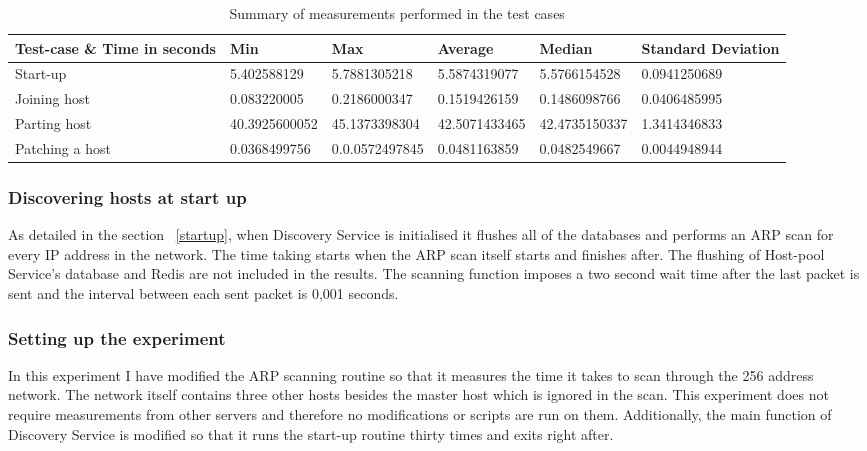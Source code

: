 \begin{landscape}
\begin{table}
\centering
\begin{tabular}{ | l || l | l | l | l | l |}
\hline 
Test-case \& Time in seconds & Min & Max & Average & Median & Standard Deviation \\
\hline \hline
Start-up & 5.402588129 & 5.7881305218 & 5.5874319077 & 5.5766154528 & 0.0941250689 \\
\hline
Joining host & 0.083220005 & 0.2186000347 & 0.1519426159 & 0.1486098766 & 0.0406485995 \\
\hline 
Parting host & 40.3925600052 & 45.1373398304 & 42.5071433465 & 42.4735150337 & 1.3414346833 \\
\hline
Patching a host & 0.0368499756 & 0.0.0572497845 & 0.0481163859 & 0.0482549667 & 0.0044948944 \\ 
\hline
\end{tabular}
\caption{Summary of measurements performed in the test cases}
\label{table:measurements}
\end{table}
\end{landscape}

\subsubsection{Discovering hosts at start up}

As detailed in the section ~\ref{startup}, when Discovery Service is initialised it flushes all of the databases and performs an ARP scan for every IP address in the network. The time taking starts when the ARP scan itself starts and finishes after. The flushing of Host-pool Service's database and Redis are not included in the results. The scanning function imposes a two second wait time after the last packet is sent and the interval between each sent packet is 0,001 seconds.

\subsubsection*{Setting up the experiment}

 In this experiment I have modified the ARP scanning routine so that it measures the time it takes to scan through the 256 address network. The network itself contains three other hosts besides the master host which is ignored in the scan. This experiment does not require measurements from other servers and therefore no modifications or scripts are run on them. Additionally, the main function of Discovery Service is modified so that it runs the start-up routine thirty times and exits right after.

